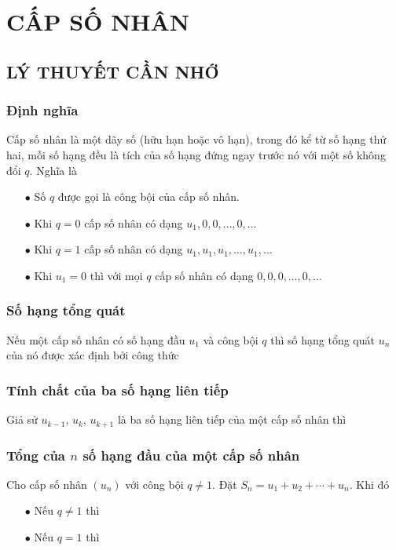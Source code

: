 \section{CẤP SỐ NHÂN}
\subsection{LÝ THUYẾT CẦN NHỚ}
\subsubsection{Định nghĩa}
Cấp số nhân là một dãy số (hữu hạn hoặc vô hạn), trong đó kể từ số hạng thứ hai, mỗi số hạng đều là tích của số hạng đứng ngay trước nó với một số không đổi $q$. Nghĩa là
\begin{gachsoc}
	\begin{itemize}
		\item [$\bullet$] Số $q$ được gọi là công bội của cấp số nhân.
		\item [$\bullet$] Khi $q=0$ cấp số nhân có dạng ${{u}_{1}},0,0,\ldots,0,\ldots$
		\item [$\bullet$] Khi $q=1$ cấp số nhân có dạng ${{u}_{1}},{{u}_{1}},{{u}_{1}},\ldots,{{u}_{1}},\ldots$
		\item [$\bullet$] Khi ${{u}_{1}}=0$ thì với mọi $q$ cấp số nhân có dạng $0,0,0,\ldots,0,\ldots$
	\end{itemize}
\end{gachsoc}

\subsubsection{Số hạng tổng quát} 
	Nếu một cấp số nhân có số hạng đầu $u_1$ và công bội $q$ thì số hạng tổng quát $u_n$ của nó được xác định bởi công thức
\subsubsection{Tính chất của ba số hạng liên tiếp} 
Giả sử $u_{k-1}$, $u_k$, $u_{k+1}$ là ba số hạng liên tiếp của một cấp số nhân thì 
\subsubsection{Tổng của $ n $ số hạng đầu của một cấp số nhân}
Cho cấp số nhân $\left(u_n\right)$ với công bội $q \neq 1$. Đặt $S_n=u_1+u_2+\cdots+u_n$. Khi đó
\begin{itemize}
	\item [$\bullet$] Nếu $q \ne 1$ thì 
	\item [$\bullet$] Nếu $ q=1 $ thì 
\end{itemize}

